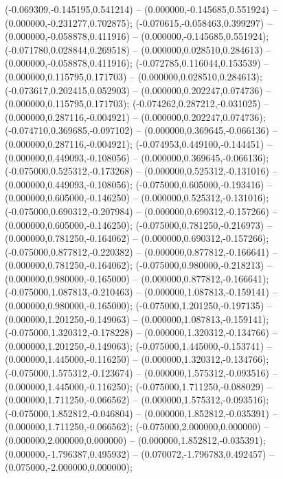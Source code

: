  (-0.069309,-0.145195,0.541214) -- (0.000000,-0.145685,0.551924) -- (0.000000,-0.231277,0.702875);
 (-0.070615,-0.058463,0.399297) -- (0.000000,-0.058878,0.411916) -- (0.000000,-0.145685,0.551924);
 (-0.071780,0.028844,0.269518) -- (0.000000,0.028510,0.284613) -- (0.000000,-0.058878,0.411916);
 (-0.072785,0.116044,0.153539) -- (0.000000,0.115795,0.171703) -- (0.000000,0.028510,0.284613);
 (-0.073617,0.202415,0.052903) -- (0.000000,0.202247,0.074736) -- (0.000000,0.115795,0.171703);
 (-0.074262,0.287212,-0.031025) -- (0.000000,0.287116,-0.004921) -- (0.000000,0.202247,0.074736);
 (-0.074710,0.369685,-0.097102) -- (0.000000,0.369645,-0.066136) -- (0.000000,0.287116,-0.004921);
 (-0.074953,0.449100,-0.144451) -- (0.000000,0.449093,-0.108056) -- (0.000000,0.369645,-0.066136);
 (-0.075000,0.525312,-0.173268) -- (0.000000,0.525312,-0.131016) -- (0.000000,0.449093,-0.108056);
 (-0.075000,0.605000,-0.193416) -- (0.000000,0.605000,-0.146250) -- (0.000000,0.525312,-0.131016);
 (-0.075000,0.690312,-0.207984) -- (0.000000,0.690312,-0.157266) -- (0.000000,0.605000,-0.146250);
 (-0.075000,0.781250,-0.216973) -- (0.000000,0.781250,-0.164062) -- (0.000000,0.690312,-0.157266);
 (-0.075000,0.877812,-0.220382) -- (0.000000,0.877812,-0.166641) -- (0.000000,0.781250,-0.164062);
 (-0.075000,0.980000,-0.218213) -- (0.000000,0.980000,-0.165000) -- (0.000000,0.877812,-0.166641);
 (-0.075000,1.087813,-0.210463) -- (0.000000,1.087813,-0.159141) -- (0.000000,0.980000,-0.165000);
 (-0.075000,1.201250,-0.197135) -- (0.000000,1.201250,-0.149063) -- (0.000000,1.087813,-0.159141);
 (-0.075000,1.320312,-0.178228) -- (0.000000,1.320312,-0.134766) -- (0.000000,1.201250,-0.149063);
 (-0.075000,1.445000,-0.153741) -- (0.000000,1.445000,-0.116250) -- (0.000000,1.320312,-0.134766);
 (-0.075000,1.575312,-0.123674) -- (0.000000,1.575312,-0.093516) -- (0.000000,1.445000,-0.116250);
 (-0.075000,1.711250,-0.088029) -- (0.000000,1.711250,-0.066562) -- (0.000000,1.575312,-0.093516);
 (-0.075000,1.852812,-0.046804) -- (0.000000,1.852812,-0.035391) -- (0.000000,1.711250,-0.066562);
 (-0.075000,2.000000,0.000000) -- (0.000000,2.000000,0.000000) -- (0.000000,1.852812,-0.035391);
 (0.000000,-1.796387,0.495932) -- (0.070072,-1.796783,0.492457) -- (0.075000,-2.000000,0.000000);
